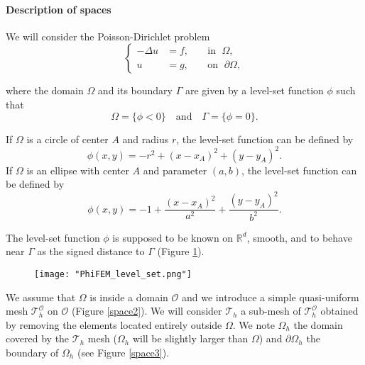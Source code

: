\paragraph{Description of spaces}

We will consider the Poisson-Dirichlet problem
\begin{equation*}
	\left\{
	\begin{aligned}
		-\Delta u &= f, \; &&\text{in } \; \Omega, \\
		u&=g, \; &&\text{on } \; \partial\Omega,
	\end{aligned}
	\right.
\end{equation*}

where the domain $\Omega$ and its boundary $\Gamma$ are given by a level-set function $\phi$ such that
\begin{equation*}
	\Omega=\{\phi < 0\} \quad \text{and} \quad \Gamma=\{\phi = 0\}.
\end{equation*}

\begin{Example}
	If $\Omega$ is a circle of center $A$ and radius $r$, the level-set function can be defined by
	\begin{equation*}
		\phi(x,y)=-r^2+(x-x_A)^2+(y-y_A)^2.
	\end{equation*}
	If $\Omega$ is an ellipse with center $A$ and parameter $(a,b)$, the level-set function can be defined by
	\begin{equation*}
		\phi(x,y)=-1+\frac{(x-x_A)^2}{a^2}+\frac{(y-y_A)^2}{b^2}.
	\end{equation*}
\end{Example}

The level-set function $\phi$ is supposed to be known on $\mathbb{R}^d$, smooth, and to behave near $\Gamma$ as the signed distance to $\Gamma$ (Figure \ref{space1}). 

\begin{figure}[H]
	\centering
	\texttt{[image: "PhiFEM\_level\_set.png"]}
	\label{space1}
\end{figure}

We assume that $\Omega$ is inside a domain $\mathcal{O}$ and we introduce a simple quasi-uniform mesh $\mathcal{T}_h^\mathcal{O}$ on $\mathcal{O}$ (Figure \ref{space2}). 
We will consider $\mathcal{T}_h$ a sub-mesh of $\mathcal{T}_h^\mathcal{O}$ obtained by removing the elements located entirely outside $\Omega$. We note $\Omega_h$ the domain covered by the $\mathcal{T}_h$ mesh ($\Omega_h$ will be slightly larger than $\Omega$) and $\partial\Omega_h$ the boundary of $\Omega_h$ (see Figure \ref{space3}).

